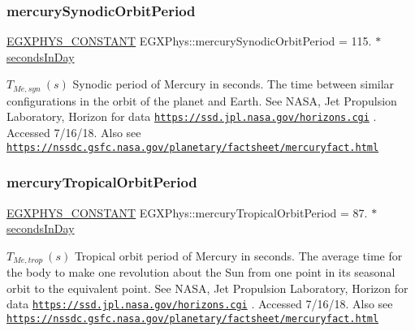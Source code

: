 \subsubsection{\texorpdfstring{mercury\+Synodic\+Orbit\+Period}{mercurySynodicOrbitPeriod}}
{\footnotesize\ttfamily \mbox{\hyperlink{group___e_g_x_phys-_constants-_macros_ga76980d288494ce1714c9ac68a95ba702}{E\+G\+X\+P\+H\+Y\+S\+\_\+\+C\+O\+N\+S\+T\+A\+NT}} E\+G\+X\+Phys\+::mercury\+Synodic\+Orbit\+Period = 115. $\ast$ \mbox{\hyperlink{namespace_e_g_x_phys_a93d2a00d75411b58cbf63ab3fd1f8bc2}{seconds\+In\+Day}}}

$ T_{Me,syn} \ (s)$ Synodic period of Mercury in seconds. The time between similar configurations in the orbit of the planet and Earth. See N\+A\+SA, Jet Propulsion Laboratory, Horizon for data \href{https://ssd.jpl.nasa.gov/horizons.cgi}{\tt https\+://ssd.\+jpl.\+nasa.\+gov/horizons.\+cgi} . Accessed 7/16/18. Also see \href{https://nssdc.gsfc.nasa.gov/planetary/factsheet/mercuryfact.html}{\tt https\+://nssdc.\+gsfc.\+nasa.\+gov/planetary/factsheet/mercuryfact.\+html} \mbox{\label{group___e_g_x_phys-_constants-_astrophysics-_solar_system-_mercury-_orbit_ga99b925409a2844db94dcfc8ceae5037a}} 
\subsubsection{\texorpdfstring{mercury\+Tropical\+Orbit\+Period}{mercuryTropicalOrbitPeriod}}
{\footnotesize\ttfamily \mbox{\hyperlink{group___e_g_x_phys-_constants-_macros_ga76980d288494ce1714c9ac68a95ba702}{E\+G\+X\+P\+H\+Y\+S\+\_\+\+C\+O\+N\+S\+T\+A\+NT}} E\+G\+X\+Phys\+::mercury\+Tropical\+Orbit\+Period = 87. $\ast$ \mbox{\hyperlink{namespace_e_g_x_phys_a93d2a00d75411b58cbf63ab3fd1f8bc2}{seconds\+In\+Day}}}

$ T_{Me,trop} \ (s)$ Tropical orbit period of Mercury in seconds. The average time for the body to make one revolution about the Sun from one point in its seasonal orbit to the equivalent point. See N\+A\+SA, Jet Propulsion Laboratory, Horizon for data \href{https://ssd.jpl.nasa.gov/horizons.cgi}{\tt https\+://ssd.\+jpl.\+nasa.\+gov/horizons.\+cgi} . Accessed 7/16/18. Also see \href{https://nssdc.gsfc.nasa.gov/planetary/factsheet/mercuryfact.html}{\tt https\+://nssdc.\+gsfc.\+nasa.\+gov/planetary/factsheet/mercuryfact.\+html} 